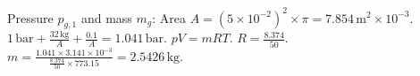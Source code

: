 Pressure \( p_{g,1} \) and mass \( m_g \):  
Area \( A = (5 \times 10^{-2})^2 \times \pi = 7.854 \, \text{m}^2 \times 10^{-3} \).  
\( 1 \, \text{bar} + \frac{32 \, \text{kg}}{A} + \frac{0.1}{A} = 1.041 \, \text{bar} \).  
\( pV = mRT \).  
\( R = \frac{8.374}{50} \).  
\( m = \frac{1.041 \times 3.141 \times 10^{-3}}{\frac{8.374}{50} \times 773.15} = 2.5426 \, \text{kg} \).